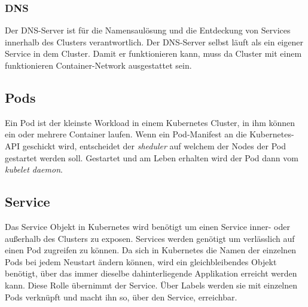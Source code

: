 \subsubsection{DNS}
Der \ac{DNS}-Server ist für die Namensaulösung und die Entdeckung von Services innerhalb des Clusters verantwortlich. 
Der \ac{DNS}-Server selbst läuft als ein eigener Service in dem Cluster.
Damit er funktionieren kann, muss da Cluster mit einem funktionieren Container-Network ausgestattet sein. 
\cite[S.34 f]{Kubernetes_up_and_running}

\subsection{Pods}
Ein Pod ist der kleinste Workload in einem Kubernetes Cluster, in ihm können ein oder mehrere Container laufen.
Wenn ein Pod-Manifest an die Kubernetes-\ac{API} geschickt wird, entscheidet der \textit{sheduler} auf welchem der Nodes der Pod gestartet werden soll.
Gestartet und am Leben erhalten wird der Pod dann vom \textit{kubelet daemon}.
\cite[S.63]{Kubernetes_up_and_running}

\subsection{Service}
Das Service Objekt in Kubernetes wird benötigt um einen Service inner- oder außerhalb des Clusters zu exposen.
Services werden genötigt um verlässlich auf einen Pod zugreifen zu können.
Da sich in Kubernetes die Namen der einzelnen Pods bei jedem Neustart ändern können, wird ein gleichbleibendes Objekt benötigt, über das immer dieselbe dahinterliegende Applikation erreicht werden kann.
Diese Rolle übernimmt der Service.
Über Labels werden sie mit einzelnen Pods verknüpft und macht ihn so, über den Service, erreichbar.
\cite[S.86]{Kubernetes_up_and_running}


